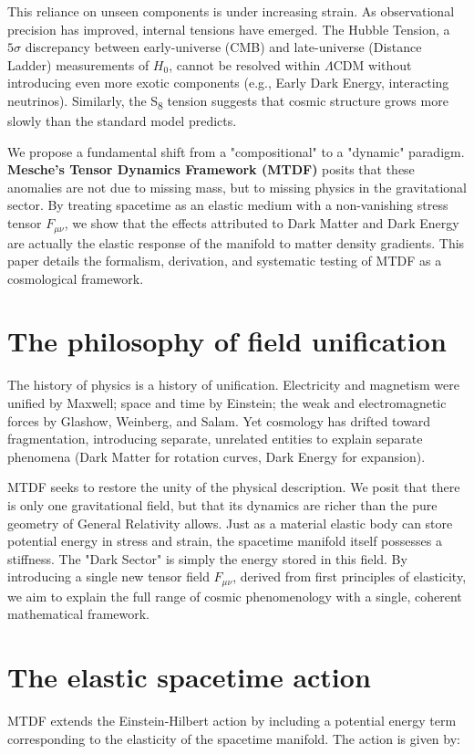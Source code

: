 \documentclass[11pt,a4paper]{article}
\begin{document}
This reliance on unseen components is under increasing strain. As observational precision has improved, internal tensions have emerged. The Hubble Tension, a $5\sigma$ discrepancy between early-universe (CMB) and late-universe (Distance Ladder) measurements of $H_0$, cannot be resolved within $\Lambda$CDM without introducing even more exotic components (e.g., Early Dark Energy, interacting neutrinos). Similarly, the S\textsubscript{8} tension suggests that cosmic structure grows more slowly than the standard model predicts.

We propose a fundamental shift from a "compositional" to a "dynamic" paradigm. \textbf{Mesche's Tensor Dynamics Framework (MTDF)} posits that these anomalies are not due to missing mass, but to missing physics in the gravitational sector. By treating spacetime as an elastic medium with a non-vanishing stress tensor $F_{\mu\nu}$, we show that the effects attributed to Dark Matter and Dark Energy are actually the elastic response of the manifold to matter density gradients. This paper details the formalism, derivation, and systematic testing of MTDF as a cosmological framework.

\section{The philosophy of field unification}
\label{sec:sec2}
The history of physics is a history of unification. Electricity and magnetism were unified by Maxwell; space and time by Einstein; the weak and electromagnetic forces by Glashow, Weinberg, and Salam. Yet cosmology has drifted toward fragmentation, introducing separate, unrelated entities to explain separate phenomena (Dark Matter for rotation curves, Dark Energy for expansion).

MTDF seeks to restore the unity of the physical description. We posit that there is only one gravitational field, but that its dynamics are richer than the pure geometry of General Relativity allows. Just as a material elastic body can store potential energy in stress and strain, the spacetime manifold itself possesses a stiffness. The "Dark Sector" is simply the energy stored in this field. By introducing a single new tensor field $F_{\mu\nu}$, derived from first principles of elasticity, we aim to explain the full range of cosmic phenomenology with a single, coherent mathematical framework.

\section{The elastic spacetime action}
\label{sec:sec3}
MTDF extends the Einstein-Hilbert action by including a potential energy term corresponding to the elasticity of the spacetime manifold. The action is given by:
\end{document}
